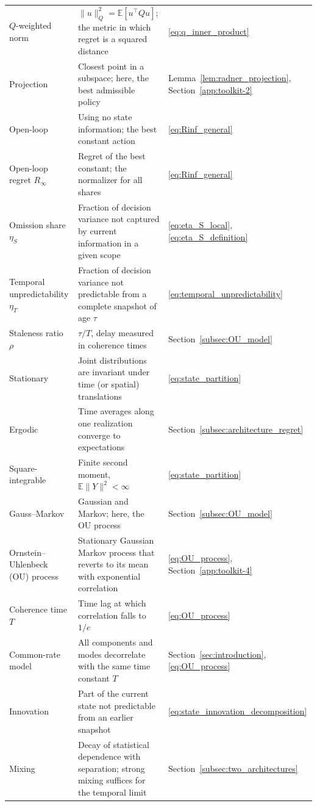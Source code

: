 \begin{longtable}{@{}p{.23\linewidth}p{.52\linewidth}p{.20\linewidth}@{}}
$Q$-weighted norm & $\|u\|_Q^2=\mathbb E[u^\top Qu]$; the metric in which regret is a squared distance & \eqref{eq:q_inner_product} \\
Projection & Closest point in a subspace; here, the best admissible policy & Lemma~\ref{lem:radner_projection}, Section~\ref{app:toolkit-2} \\
Open-loop & Using no state information; the best constant action & \eqref{eq:Rinf_general} \\
Open-loop regret $R_\infty$ & Regret of the best constant; the normalizer for all shares & \eqref{eq:Rinf_general} \\
Omission share $\eta_S$ & Fraction of decision variance not captured by current information in a given scope & \eqref{eq:eta_S_local}, \eqref{eq:eta_S_definition} \\
Temporal unpredictability $\eta_T$ & Fraction of decision variance not predictable from a complete snapshot of age $\tau$ & \eqref{eq:temporal_unpredictability} \\
Staleness ratio $\rho$ & $\tau/T$, delay measured in coherence times & Section~\ref{subsec:OU_model} \\
Stationary & Joint distributions are invariant under time (or spatial) translations & \eqref{eq:state_partition} \\
Ergodic & Time averages along one realization converge to expectations & Section~\ref{subsec:architecture_regret} \\
Square-integrable & Finite second moment, $\mathbb E\|Y\|^2<\infty$ & \eqref{eq:state_partition} \\
Gauss--Markov & Gaussian and Markov; here, the OU process & Section~\ref{subsec:OU_model} \\
Ornstein--Uhlenbeck (OU) process & Stationary Gaussian Markov process that reverts to its mean with exponential correlation & \eqref{eq:OU_process}, Section~\ref{app:toolkit-4} \\
Coherence time $T$ & Time lag at which correlation falls to $1/e$ & \eqref{eq:OU_process} \\
Common-rate model & All components and modes decorrelate with the same time constant $T$ & Section~\ref{sec:introduction}, \eqref{eq:OU_process} \\
Innovation & Part of the current state not predictable from an earlier snapshot & \eqref{eq:state_innovation_decomposition} \\
Mixing & Decay of statistical dependence with separation; strong mixing suffices for the temporal limit & Section~\ref{subsec:two_architectures} \\

\end{longtable}

